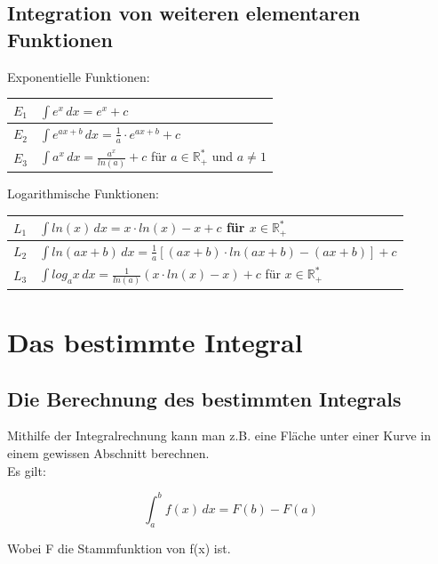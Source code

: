 \documentclass[12pt]{scrartcl}
\begin{document}
\subsection{Integration von weiteren elementaren Funktionen}
Exponentielle Funktionen:
\begin{center}
    \renewcommand{\arraystretch}{2}
    \begin{tabular}{| m{5em} | m{25em} | }
        \hline
        $E_1$ & $\int e^x \, dx = e^x + c$ \\
        \hline
        $E_2$ & $\int e^{ax + b} \, dx = \frac{1}{a} \cdot e^{ax+b} + c$ \\
        \hline
        $E_3$ & $\int a^x \, dx = \frac{a^x}{ln(a)} + c$ \qquad \qquad \quad für $a \in \mathbb{R}_{+}^{*}$ und $a \neq 1$\\
        \hline
    \end{tabular}
\end{center}
Logarithmische Funktionen:
\begin{center}
    \renewcommand{\arraystretch}{2}
    \begin{tabular}{| m{5em} | m{25em} | }
        \hline
        $L_1$ & $\int ln(x) \, dx = x \cdot ln(x) - x + c$ für $x \in \mathbb{R}_{+}^{*} $\\
        \hline
        $L_2$ & $\int ln(ax + b) \, dx = \frac{1}{a}[(ax + b) \cdot ln(ax+b) - (ax + b)] + c$ \\
        \hline
        $L_3$ & $\int log_ax \, dx = \frac{1}{ln(a)}(x \cdot ln(x) - x) + c$ für $x \in \mathbb{R}_{+}^{*}$ \\
        \hline
    \end{tabular}
\end{center}

\newpage

\section{Das bestimmte Integral}
\subsection{Die Berechnung des bestimmten Integrals}
Mithilfe der Integralrechnung kann man z.B. eine Fläche unter einer Kurve in einem 
gewissen Abschnitt berechnen. \\
\noindent
Es gilt: 

\[\int_{a}^{b} f(x) \, dx = F(b) - F(a)\]

Wobei F die Stammfunktion von f(x) ist.\\
\end{document}
